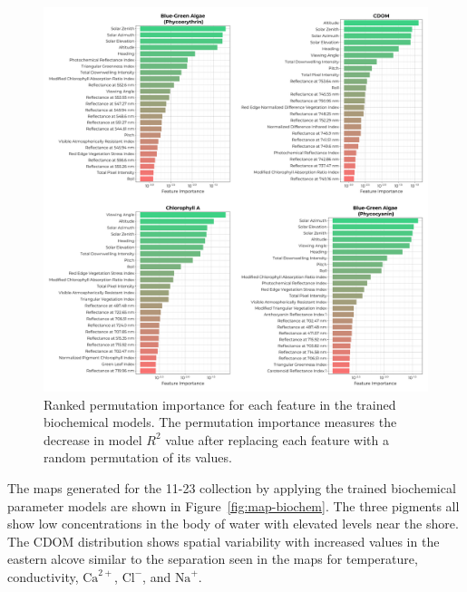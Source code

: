 \documentclass[sensors,article,submit,pdftex,moreauthors]{Definitions/mdpi}
\begin{document}
\begin{figure}
\centering
\includegraphics[width=\columnwidth]{paper/figures/results/fits/biochemical-ranking.pdf}
\caption{Ranked permutation importance for each feature in the trained biochemical models. The permutation importance measures the decrease in model $R^2$ value after replacing each feature with a random permutation of its values.\label{fig:biochem-fi}}
\end{figure}  

The maps generated for the 11-23 collection by applying the trained biochemical parameter models are shown in Figure~\ref{fig:map-biochem}. The three pigments all show low concentrations in the body of water with elevated levels near the shore. The CDOM distribution shows spatial variability with increased values in the eastern alcove similar to the separation seen in the maps for temperature, conductivity, $\textrm{Ca}^{2+}$, $\textrm{Cl}^{-}$, and $\textrm{Na}^{+}$.
\end{document}
